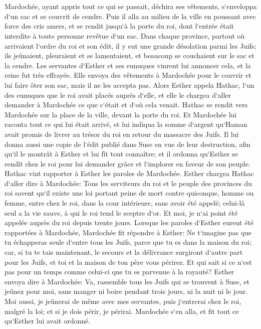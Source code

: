 \chapter{}

\verse Mardochée, ayant appris tout ce qui se passait, déchira ses vêtements, s`enveloppa d`un sac et se couvrit de cendre. Puis il alla au milieu de la ville en poussant avec force des cris amers, 
\verse et se rendit jusqu`à la porte du roi, dont l`entrée était interdite à toute personne revêtue d`un sac. 
\verse Dans chaque province, partout où arrivaient l`ordre du roi et son édit, il y eut une grande désolation parmi les Juifs; ils jeûnaient, pleuraient et se lamentaient, et beaucoup se couchaient sur le sac et la cendre. 
\verse Les servantes d`Esther et ses eunuques vinrent lui annoncer cela, et la reine fut très effrayée. Elle envoya des vêtements à Mardochée pour le couvrir et lui faire ôter son sac, mais il ne les accepta pas. 
\verse Alors Esther appela Hathac, l`un des eunuques que le roi avait placés auprès d`elle, et elle le chargea d`aller demander à Mardochée ce que c`était et d`où cela venait. 
\verse Hathac se rendit vers Mardochée sur la place de la ville, devant la porte du roi. 
\verse Et Mardochée lui raconta tout ce qui lui était arrivé, et lui indiqua la somme d`argent qu`Haman avait promis de livrer au trésor du roi en retour du massacre des Juifs. 
\verse Il lui donna aussi une copie de l`édit publié dans Suse en vue de leur destruction, afin qu`il le montrât à Esther et lui fît tout connaître; et il ordonna qu`Esther se rendît chez le roi pour lui demander grâce et l`implorer en faveur de son peuple. 
\verse Hathac vint rapporter à Esther les paroles de Mardochée. 
\verse Esther chargea Hathac d`aller dire à Mardochée: 
\verse Tous les serviteurs du roi et le peuple des provinces du roi savent qu`il existe une loi portant peine de mort contre quiconque, homme ou femme, entre chez le roi, dans la cour intérieure, sans avoir été appelé; celui-là seul a la vie sauve, à qui le roi tend le sceptre d`or. Et moi, je n`ai point été appelée auprès du roi depuis trente jours. 
\verse Lorsque les paroles d`Esther eurent été rapportées à Mardochée, 
\verse Mardochée fit répondre à Esther: Ne t`imagine pas que tu échapperas seule d`entre tous les Juifs, parce que tu es dans la maison du roi; 
\verse car, si tu te tais maintenant, le secours et la délivrance surgiront d`autre part pour les Juifs, et toi et la maison de ton père vous périrez. Et qui sait si ce n`est pas pour un temps comme celui-ci que tu es parvenue à la royauté? 
\verse Esther envoya dire à Mardochée: 
\verse Va, rassemble tous les Juifs qui se trouvent à Suse, et jeûnez pour moi, sans manger ni boire pendant trois jours, ni la nuit ni le jour. Moi aussi, je jeûnerai de même avec mes servantes, puis j`entrerai chez le roi, malgré la loi; et si je dois périr, je périrai. 
\verse Mardochée s`en alla, et fit tout ce qu`Esther lui avait ordonné. 


